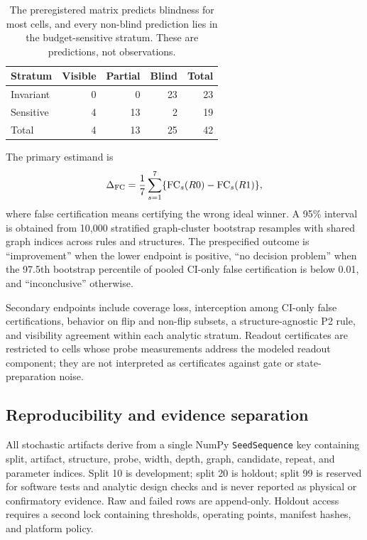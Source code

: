 \documentclass[10pt,twocolumn]{article}
\newcommand{\code}[1]{\texttt{#1}}
\begin{document}
\begin{table}[t]
\centering
\caption{The preregistered matrix predicts blindness for most cells, and every
non-blind prediction lies in the budget-sensitive stratum. These are
predictions, not observations.}
\label{tab:matrix}
\begin{tabular}{@{}lrrrr@{}}
\toprule
Stratum & Visible & Partial & Blind & Total \\
\midrule
Invariant & 0 & 0 & 23 & 23 \\
Sensitive & 4 & 13 & 2 & 19 \\
\midrule
Total & 4 & 13 & 25 & 42 \\
\bottomrule
\end{tabular}
\end{table}

The primary estimand is
\begin{equation}
 \Delta_{\rm FC}=\frac{1}{7}\sum_{s=1}^{7}
 \{\mathrm{FC}_s(R0)-\mathrm{FC}_s(R1)\},
 \label{eq:dfc}
\end{equation}
where false certification means certifying the wrong ideal winner. A 95\%
interval is obtained from 10,000 stratified graph-cluster bootstrap resamples
with shared graph indices across rules and structures. The prespecified outcome
is ``improvement'' when the lower endpoint is positive, ``no decision problem''
when the 97.5th bootstrap percentile of pooled CI-only false certification is
below 0.01, and ``inconclusive'' otherwise.

Secondary endpoints include coverage loss, interception among CI-only false
certifications, behavior on flip and non-flip subsets, a structure-agnostic P2
rule, and visibility agreement within each analytic stratum. Readout
certificates are restricted to cells whose probe measurements address the
modeled readout component; they are not interpreted as certificates against
gate or state-preparation noise.

\subsection{Reproducibility and evidence separation}

All stochastic artifacts derive from a single NumPy \code{SeedSequence} key
containing split, artifact, structure, probe, width, depth, graph, candidate,
repeat, and parameter indices. Split 10 is development; split 20 is holdout;
split 99 is reserved for software tests and analytic design checks and is never
reported as physical or confirmatory evidence. Raw and failed rows are
append-only. Holdout access requires a second lock containing thresholds,
operating points, manifest hashes, and platform policy.
\end{document}
